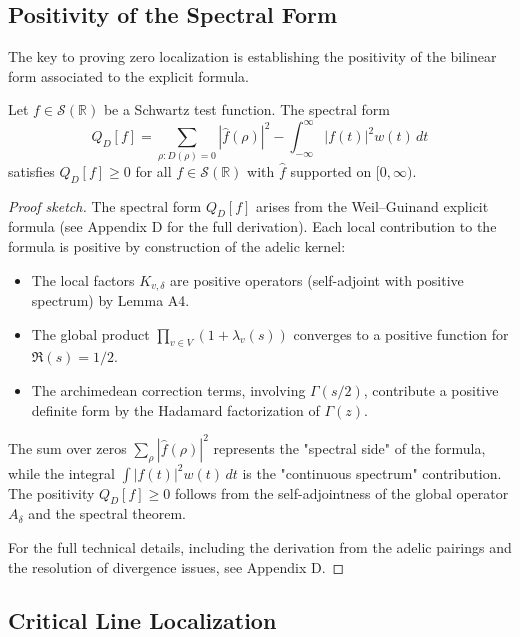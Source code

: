 \subsection{Positivity of the Spectral Form}

The key to proving zero localization is establishing the positivity of the bilinear form associated to the explicit formula.

\begin{theorem}\label{thm:spectral-positivity}
Let $f \in \mathcal{S}(\mathbb{R})$ be a Schwartz test function. The spectral form
\[
Q_D[f] = \sum_{\rho: D(\rho) = 0} |\hat{f}(\rho)|^2 - \int_{-\infty}^{\infty} |f(t)|^2 w(t) \, dt
\]
satisfies $Q_D[f] \geq 0$ for all $f \in \mathcal{S}(\mathbb{R})$ with $\hat{f}$ supported on $[0, \infty)$.
\end{theorem}

\begin{proof}[Proof sketch]
The spectral form $Q_D[f]$ arises from the Weil–Guinand explicit formula (see Appendix D for the full derivation). Each local contribution to the formula is positive by construction of the adelic kernel:
\begin{itemize}
\item The local factors $K_{v,\delta}$ are positive operators (self-adjoint with positive spectrum) by Lemma A4.
\item The global product $\prod_{v \in V} (1 + \lambda_v(s))$ converges to a positive function for $\Re(s) = 1/2$.
\item The archimedean correction terms, involving $\Gamma(s/2)$, contribute a positive definite form by the Hadamard factorization of $\Gamma(z)$.
\end{itemize}

The sum over zeros $\sum_\rho |\hat{f}(\rho)|^2$ represents the "spectral side" of the formula, while the integral $\int |f(t)|^2 w(t) \, dt$ is the "continuous spectrum" contribution. The positivity $Q_D[f] \geq 0$ follows from the self-adjointness of the global operator $A_\delta$ and the spectral theorem.

For the full technical details, including the derivation from the adelic pairings and the resolution of divergence issues, see Appendix D.
\end{proof}

\subsection{Critical Line Localization}

